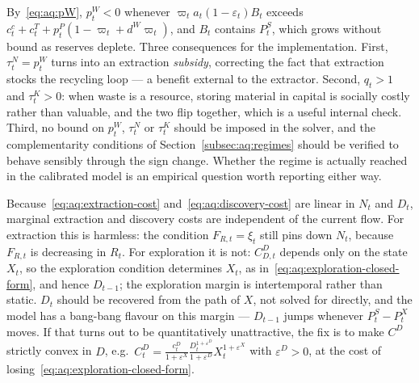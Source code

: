 \begin{remark}\label{rem:aq:pW-sign}
By~\eqref{eq:aq:pW}, $p^W_t<0$ whenever $\varpi_ta_t(1-\varepsilon_t)B_t$ exceeds $c^c_t+c^T_t+p^P_t\left(1-\varpi_t+d^W\varpi_t\right)$, and $B_t$ contains $P^S_t$, which grows without bound as reserves deplete. Three consequences for the implementation. First, $\tau^N_t=p^W_t$ turns into an extraction \emph{subsidy}, correcting the fact that extraction stocks the recycling loop --- a benefit external to the extractor. Second, $q_t>1$ and $\tau^K_t>0$: when waste is a resource, storing material in capital is socially costly rather than valuable, and the two flip together, which is a useful internal check. Third, no bound on $p^W_t$, $\tau^N_t$ or $\tau^K_t$ should be imposed in the solver, and the complementarity conditions of Section~\ref{subsec:aq:regimes} should be verified to behave sensibly through the sign change. Whether the regime is actually reached in the calibrated model is an empirical question worth reporting either way.
\end{remark}

\begin{remark}\label{rem:aq:linear-costs}
Because~\eqref{eq:aq:extraction-cost} and~\eqref{eq:aq:discovery-cost} are linear in $N_t$ and $D_t$, marginal extraction and discovery costs are independent of the current flow. For extraction this is harmless: the condition $F_{R,t}=\xi_t$ still pins down $N_t$, because $F_{R,t}$ is decreasing in $R_t$. For exploration it is not: $C^D_{D,t}$ depends only on the state $X_t$, so the exploration condition determines $X_t$, as in~\eqref{eq:aq:exploration-closed-form}, and hence $D_{t-1}$; the exploration margin is intertemporal rather than static. $D_t$ should be recovered from the path of $X$, not solved for directly, and the model has a bang-bang flavour on this margin --- $D_{t-1}$ jumps whenever $P^S_t-P^X_t$ moves. If that turns out to be quantitatively unattractive, the fix is to make $C^D$ strictly convex in $D$, e.g.\ $C^D_t=\frac{c^D_t}{1+\varepsilon^X}\frac{D_t^{1+\varepsilon^D}}{1+\varepsilon^D}X_t^{1+\varepsilon^X}$ with $\varepsilon^D>0$, at the cost of losing~\eqref{eq:aq:exploration-closed-form}.
\end{remark}

